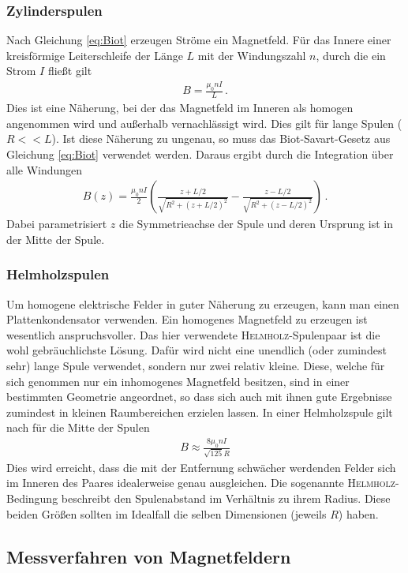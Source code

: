\documentclass[12pt,a4paper,titlepage,headinclude,bibtotoc]{scrartcl}
\begin{document}
\subsubsection*{Zylinderspulen}
Nach Gleichung \ref{eq:Biot} erzeugen Ströme ein Magnetfeld.
Für das Innere einer kreisförmige Leiterschleife der Länge $L$ mit der Windungszahl $n$, durch die ein Strom $I$ fließt gilt
\begin{align}
	B=\frac{\mu_0 nI}L\,.
\end{align}
Dies ist eine Näherung, bei der das Magnetfeld im Inneren als homogen angenommen wird und außerhalb vernachlässigt wird.
Dies gilt für lange Spulen ($R<<L$).
Ist diese Näherung zu ungenau, so muss das Biot-Savart-Gesetz aus Gleichung \eqref{eq:Biot} verwendet werden.
Daraus ergibt durch die Integration über alle Windungen
\begin{align}
	B(z)=\frac{\mu_0 nI}{2}\left(\frac{z+L/2}{\sqrt{R^2+(z+L/2)^2}}-\frac{z-L/2}{\sqrt{R^2+(z-L/2)^2}}\right)\,.\label{eq:BSpule}
\end{align}
Dabei parametrisiert $z$ die Symmetrieachse der Spule und deren Ursprung ist in der Mitte der Spule.

\subsubsection*{Helmholzspulen}
Um homogene elektrische Felder in guter Näherung zu erzeugen, kann man einen Plattenkondensator verwenden.
Ein homogenes Magnetfeld zu erzeugen ist wesentlich anspruchsvoller. 
Das hier verwendete \textsc{Helmholz}-Spulenpaar ist die wohl gebräuchlichste Lösung.
Dafür wird nicht eine unendlich (oder zumindest sehr) lange Spule verwendet, sondern nur zwei relativ kleine.
Diese, welche für sich genommen nur ein inhomogenes Magnetfeld besitzen, sind in einer bestimmten Geometrie angeordnet, so dass sich auch mit ihnen gute Ergebnisse zumindest in kleinen Raumbereichen erzielen lassen.
In einer Helmholzspule gilt nach \cite[S. 94]{demtroeder2} für die Mitte der Spulen
\begin{align}
	B\approx\frac{8\mu_0nI}{\sqrt{125}R}\label{eq:BHelm}
\end{align}
Dies wird erreicht, dass die mit der Entfernung schwächer werdenden Felder sich im Inneren des Paares idealerweise genau ausgleichen.
Die sogenannte \textsc{Helmholz}-Bedingung beschreibt den Spulenabstand im Verhältnis zu ihrem Radius.
Diese beiden Größen sollten im Idealfall die selben Dimensionen (jeweils $R$) haben.\\
\subsection{Messverfahren von Magnetfeldern}
\end{document}
